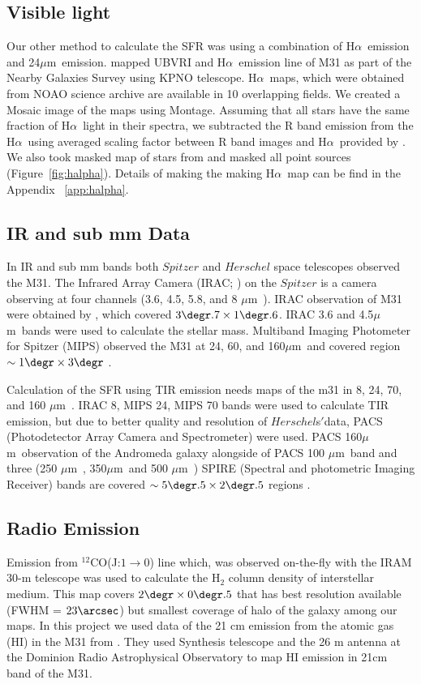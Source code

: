 \documentclass[useAMS,usenatbib]{mn2e}
\newcommand \halpha    {H$\alpha $\ }
\newcommand \um    {$\mu$m\ }
\begin{document}
\subsection{Visible light}
Our other method to calculate the SFR was using a combination of \halpha emission and 24\um emission. \cite{Massey06, Massey07} mapped UBVRI and \halpha emission line of M31 as part of the Nearby Galaxies Survey using KPNO telescope. \halpha maps, which were obtained from NOAO science archive are available in 10 overlapping fields. We created a Mosaic image of the maps using Montage. Assuming that all stars have the same fraction of \halpha light in their spectra, we subtracted the R band emission from the \halpha using averaged scaling factor between R band images and \halpha provided by \cite{Azimlu11}. We also took masked map of stars from \cite{Azimlu11} and masked all point sources (Figure~\ref{fig:halpha}). Details of making the making \halpha map can be find in the Appendix ~\ref{app:halpha}.

\subsection{IR and sub mm Data}
In IR and sub mm bands both $Spitzer$ \citep{Wener04} and $Herschel$ \citep{Pilbratt10}  space telescopes observed the M31. The Infrared Array Camera (IRAC; \citep{Fazio04}) on the $Spitzer$ is a camera observing at four channels (3.6, 4.5, 5.8, and 8 \um). IRAC observation of M31 were obtained by \cite{Barmby06}, which covered $3\degr.7 \times 1\degr.6$. IRAC 3.6 and 4.5\um bands  were used to calculate the stellar mass. Multiband Imaging Photometer for Spitzer (MIPS) observed the  M31 at 24, 60, and 160\um and covered region $\sim 1\degr \times 3\degr$ \citep{Gordon06}.

Calculation of the SFR using TIR emission needs maps of the m31 in 8, 24, 70, and 160 \um. IRAC 8, MIPS 24, MIPS 70 bands were used to calculate TIR emission, but due to better quality and resolution of $Herschel$s$'$data, PACS (Photodetector Array Camera and Spectrometer) \citep{Poglitsch10} were used. PACS 160\um observation of the Andromeda galaxy alongside of PACS 100 \um band and three (250 \um, 350\um and 500 \um) SPIRE (Spectral and photometric Imaging Receiver) \citep{Griffin10} bands are covered $\sim 5\degr.5 \times 2\degr.5$ regions \citep{Fritz12}.

\subsection{Radio Emission}
Emission from $^{12}$CO(J:$1\rightarrow0$) line which, was observed on-the-fly with the IRAM 30-m telescope\citep{Nieten06} was used to calculate the H$_2$ column density of interstellar medium. This map covers $2\degr \times 0\degr.5$ that has best resolution available (FWHM = $23\arcsec$) but smallest coverage of halo of the galaxy among our maps. In this project we used data of the 21 cm emission from the atomic gas (HI) in the M31 from \cite{Chemin09}. They used Synthesis telescope and the 26 m antenna at the Dominion Radio Astrophysical Observatory to map HI emission in 21cm band of the M31.
\end{document}
